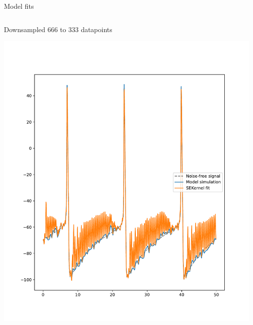 \documentclass[presentation]{beamer}
\begin{document}
\begin{frame}[plain,label={sec:org23978bc}]{Model fits}
\begin{columns}
\begin{column}{0.5\columnwidth}
\begin{center}
Downsampled 666 to 333 datapoints
\end{center}
\begin{center}
\includegraphics[width=1.1\textwidth]{./downsample333.pdf}
\end{center}
\end{column}


\end{columns}
\end{frame}
\end{document}
